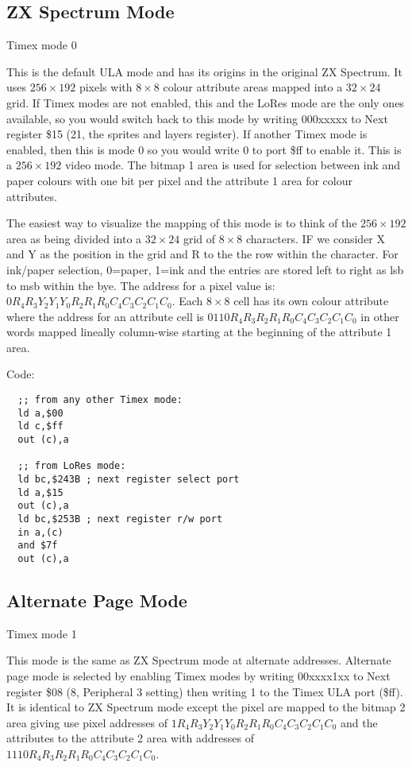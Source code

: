 \subsection{ZX Spectrum Mode}

Timex mode 0

This is the default ULA mode and has its origins in the original ZX
Spectrum. It uses $256\times192$ pixels with $8\times8$ colour
attribute areas mapped into a $32\times24$ grid. If Timex modes are
not enabled, this and the LoRes mode are the only ones available, so
you would switch back to this mode by writing 000xxxxx to Next
register \$15 (21, the sprites and layers register). If another Timex
mode is enabled, then this is mode 0 so you would write 0 to port \$ff
to enable it. This is a $256\times192$ video mode. The bitmap 1 area
is used for selection between ink and paper colours with one bit per
pixel and the attribute 1 area for colour attributes.

The easiest way to visualize the mapping of this mode is to think of
the $256\times192$ area as being divided into a $32\times24$ grid of
$8\times8$ characters.  IF we consider X and Y as the position in the
grid and R to the the row within the character.  For ink/paper
selection, 0=paper, 1=ink and the entries are stored left to right as
lsb to msb within the bye.  The address for a pixel value is:
$0R_4R_3Y_2Y_1Y_0R_2R_1R_0C_4C_3C_2C_1C_0$. Each $8\times8$ cell has
its own colour attribute where the address for an attribute cell is
$0110R_4R_3R_2R_1R_0C_4C_3C_2C_1C_0$ in other words mapped lineally
column-wise starting at the beginning of the attribute 1 area.

Code:
\begin{verbatim}
  ;; from any other Timex mode:
  ld a,$00
  ld c,$ff
  out (c),a

  ;; from LoRes mode:
  ld bc,$243B ; next register select port
  ld a,$15
  out (c),a
  ld bc,$253B ; next register r/w port
  in a,(c)
  and $7f
  out (c),a
\end{verbatim}

\subsection{Alternate Page Mode}

Timex mode 1

This mode is the same as ZX Spectrum mode at alternate
addresses. Alternate page mode is selected by enabling Timex modes by
writing 00xxxx1xx to Next register \$08 (8, Peripheral 3 setting) then
writing 1 to the Timex ULA port (\$ff).  It is identical to ZX
Spectrum mode except the pixel are mapped to the bitmap 2 area giving
use pixel addresses of $1R_4R_3Y_2Y_1Y_0R_2R_1R_0C_4C_3C_2C_1C_0$ and
the attributes to the attribute 2 area with addresses of
$1110R_4R_3R_2R_1R_0C_4C_3C_2C_1C_0$.

